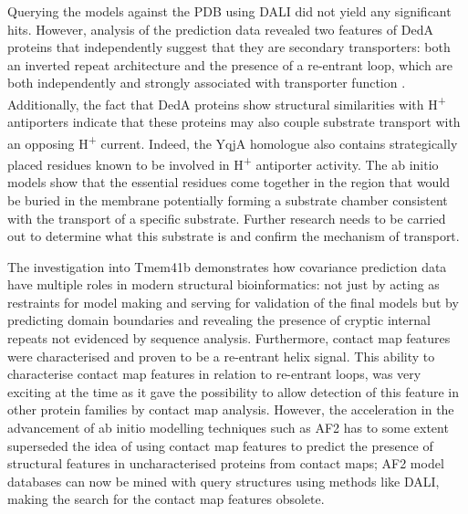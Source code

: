 Querying the models against the PDB using DALI did not yield any significant hits. However, analysis of the prediction data revealed two features of DedA proteins that independently suggest that they are secondary transporters: both an inverted repeat architecture and the presence of a re-entrant loop, which are both independently and strongly associated with transporter function \cite{Duran2013} \cite{Yan2010}. Additionally, the fact that DedA proteins show structural similarities with H\textsuperscript{+} antiporters indicate that these proteins may also couple substrate transport with an opposing H\textsuperscript{+} current. Indeed, the YqjA homologue also contains strategically placed residues known to be involved in H\textsuperscript{+} antiporter activity. The ab initio models show that the essential residues come together in the region that would be buried in the membrane potentially forming a substrate chamber consistent with the transport of a specific substrate. Further research needs to be carried out to determine what this substrate is and confirm the mechanism of transport.

The investigation into Tmem41b demonstrates how covariance prediction data have multiple roles in modern structural bioinformatics: not just by acting as restraints for model making and serving for validation of the final models but by predicting domain boundaries and revealing the presence of cryptic internal repeats not evidenced by sequence analysis. Furthermore, contact map features were characterised and proven to be a re-entrant helix signal.  This ability to characterise contact map features in relation to re-entrant loops, was very exciting at the time as it gave the possibility to allow detection of this feature in other protein families by contact map analysis.  However, the acceleration in the advancement of ab initio modelling techniques such as AF2 has to some extent superseded the idea of using contact map features to predict the presence of structural features in uncharacterised proteins from contact maps; AF2 model databases can now be mined with query structures using methods like DALI, making the search for the contact map features obsolete.






